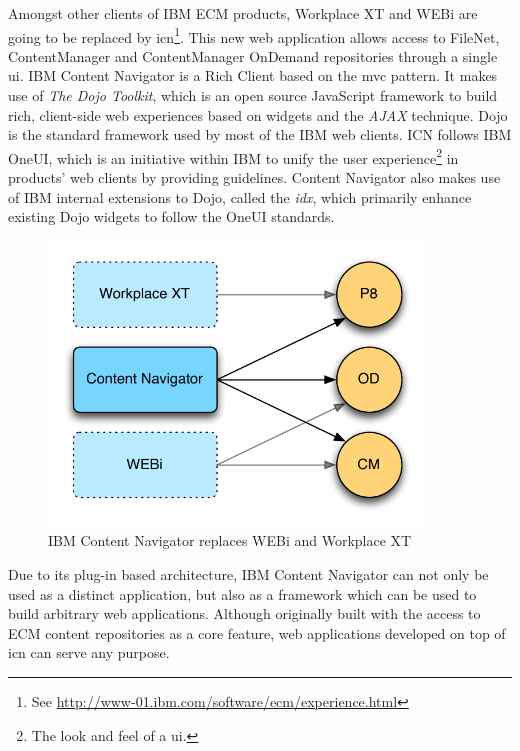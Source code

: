 
Amongst other clients of IBM ECM products, Workplace XT and WEBi are going to be replaced by \ac{icn}\footnote{See \url{http://www-01.ibm.com/software/ecm/experience.html}}. This new web application allows access to FileNet, ContentManager and ContentManager OnDemand repositories through a single \acl{ui}. 
IBM Content Navigator is a Rich Client based on the \acl{mvc} pattern. It makes use of \emph{The Dojo Toolkit}, which is an open source JavaScript framework to build rich, client-side web experiences based on widgets and the \emph{AJAX} technique. Dojo is the standard framework used by most of the IBM web clients.
ICN follows IBM OneUI, which is an initiative within IBM to unify the user experience\footnote{The look and feel of a \acl{ui}.} in products' web clients by providing guidelines. Content Navigator also makes use of IBM internal extensions to Dojo, called the \emph{\acl{idx}}, which primarily enhance existing Dojo widgets to follow the OneUI standards.


\begin{figure}[H]
	\centering
	\includegraphics[width=10cm]{images/nexus.pdf}
	\caption{IBM Content Navigator replaces WEBi and Workplace XT}
	\label{fig:nexusp8cmod}
\end{figure}

Due to its plug-in based architecture, IBM Content Navigator can not only be used as a distinct application, but also as a framework which can be used to build arbitrary web applications. Although originally built with the access to ECM content repositories as a core feature, web applications developed on top of \ac{icn} can serve any purpose.

